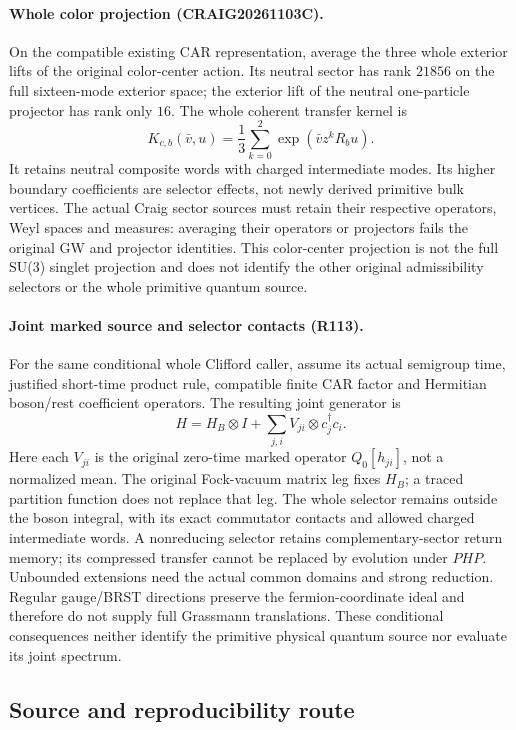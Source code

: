 \paragraph{Whole color projection (CRAIG20261103C).}
On the compatible existing CAR representation, average the three whole
exterior lifts of the original color-center action. Its neutral sector
has rank $21856$ on the full sixteen-mode exterior space; the exterior
lift of the neutral one-particle projector has rank only $16$.
The whole coherent transfer kernel is
\[
 K_{c,b}(\bar v,u)=\frac13\sum_{k=0}^{2}
                    \exp(\bar v z^kR_bu).
\]
It retains neutral composite words with charged intermediate modes.
Its higher boundary coefficients are selector effects, not newly derived
primitive bulk vertices. The actual Craig sector sources must retain
their respective operators, Weyl spaces and measures: averaging their
operators or projectors fails the original GW and projector identities.
This color-center projection is not the full SU(3) singlet projection
and does not identify the other original admissibility selectors or the
whole primitive quantum source.

\paragraph{Joint marked source and selector contacts (R113).}
For the same conditional whole Clifford caller, assume its actual
semigroup time, justified short-time product rule, compatible finite CAR
factor and Hermitian boson/rest coefficient operators. The resulting
joint generator is
\[
 H=H_B\otimes I+\sum_{j,i}V_{ji}\otimes c_j^\dagger c_i.
\]
Here each $V_{ji}$ is the original zero-time marked operator
$Q_0[h_{ji}]$, not a
normalized mean. The original Fock-vacuum matrix leg fixes $H_B$;
a traced partition function does not replace that leg. The whole
selector remains outside the boson integral, with its exact commutator
contacts and allowed charged intermediate words. A nonreducing selector
retains complementary-sector return memory; its compressed transfer
cannot be replaced by evolution under $PHP$. Unbounded extensions need
the actual common domains and strong reduction. Regular gauge/BRST
directions preserve the fermion-coordinate ideal and therefore do not
supply full Grassmann translations. These conditional consequences
neither identify the primitive physical quantum source nor evaluate its
joint spectrum.

\subsection*{Source and reproducibility route}

